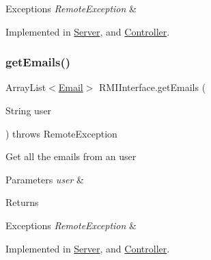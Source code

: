 \begin{DoxyExceptions}{Exceptions}
{\em Remote\+Exception} & \\
\hline
\end{DoxyExceptions}


Implemented in \hyperlink{class_server_ad679fc8c7704690482684e42cc15c740}{Server}, and \hyperlink{class_controller_ab681529b51d028c04978b1856f481809}{Controller}.

\mbox{\label{interface_r_m_i_interface_ad326010c8c132dd3398a4443cf827601}} 
\subsubsection{\texorpdfstring{get\+Emails()}{getEmails()}}
{\footnotesize\ttfamily Array\+List$<$\hyperlink{class_email}{Email}$>$ R\+M\+I\+Interface.\+get\+Emails (\begin{DoxyParamCaption}\item[{String}]{user }\end{DoxyParamCaption}) throws Remote\+Exception}

Get all the emails from an user 
\begin{DoxyParams}{Parameters}
{\em user} & \\
\hline
\end{DoxyParams}
\begin{DoxyReturn}{Returns}

\begin{DoxyItemize}
\item 
\end{DoxyItemize}
\end{DoxyReturn}

\begin{DoxyExceptions}{Exceptions}
{\em Remote\+Exception} & \\
\hline
\end{DoxyExceptions}


Implemented in \hyperlink{class_server_a348f49650335ef5341a4d960d6adac2e}{Server}, and \hyperlink{class_controller_ab019b3e68c16d6be3c3e9a33ca11ba8f}{Controller}.

\mbox{\label{interface_r_m_i_interface_ad86e01382cdb0cb8a64710a7e9102524}} 
